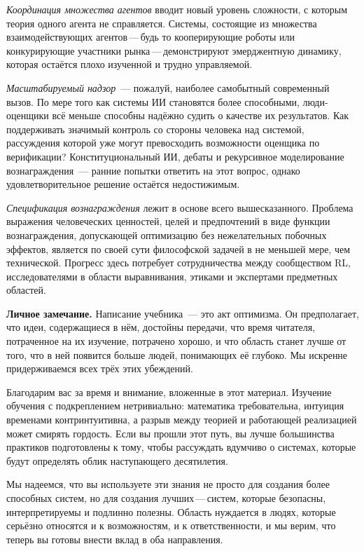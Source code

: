 \emph{Координация множества агентов} вводит новый уровень сложности, с которым теория одного агента не справляется. Системы, состоящие из множества взаимодействующих агентов\,---\,будь то кооперирующие роботы или конкурирующие участники рынка\,---\,демонстрируют эмерджентную динамику, которая остаётся плохо изученной и трудно управляемой.

\emph{Масштабируемый надзор}~--- пожалуй, наиболее самобытный современный вызов. По мере того как системы ИИ становятся более способными, люди-оценщики всё меньше способны надёжно судить о качестве их результатов. Как поддерживать значимый контроль со стороны человека над системой, рассуждения которой уже могут превосходить возможности оценщика по верификации? Конституциональный ИИ, дебаты и рекурсивное моделирование вознаграждения~--- ранние попытки ответить на этот вопрос, однако удовлетворительное решение остаётся недостижимым.

\emph{Спецификация вознаграждения} лежит в основе всего вышесказанного. Проблема выражения человеческих ценностей, целей и предпочтений в виде функции вознаграждения, допускающей оптимизацию без нежелательных побочных эффектов, является по своей сути философской задачей в не меньшей мере, чем технической. Прогресс здесь потребует сотрудничества между сообществом RL, исследователями в области выравнивания, этиками и экспертами предметных областей.

\medskip

\textbf{Личное замечание.}\quad
Написание учебника~--- это акт оптимизма. Он предполагает, что идеи, содержащиеся в нём, достойны передачи, что время читателя, потраченное на их изучение, потрачено хорошо, и что область станет лучше от того, что в ней появится больше людей, понимающих её глубоко. Мы искренне придерживаемся всех трёх этих убеждений.

Благодарим вас за время и внимание, вложенные в этот материал. Изучение обучения с подкреплением нетривиально: математика требовательна, интуиция временами контринтуитивна, а разрыв между теорией и работающей реализацией может смирять гордость. Если вы прошли этот путь, вы лучше большинства практиков подготовлены к тому, чтобы рассуждать вдумчиво о системах, которые будут определять облик наступающего десятилетия.

Мы надеемся, что вы используете эти знания не просто для создания более способных систем, но для создания лучших\,---\,систем, которые безопасны, интерпретируемы и подлинно полезны. Область нуждается в людях, которые серьёзно относятся и к возможностям, и к ответственности, и мы верим, что теперь вы готовы внести вклад в оба направления.

